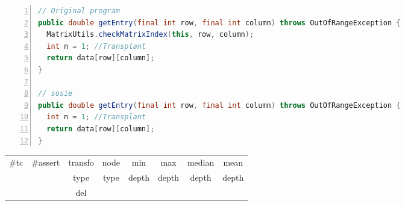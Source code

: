 \begin{minipage}{\columnwidth}
\begin{lstlisting}[caption={Two variants of \texttt{getEntry} in commons.maths},language=java,numbers=left]
// Original program
public double getEntry(final int row, final int column) throws OutOfRangeException {
  MatrixUtils.checkMatrixIndex(this, row, column);
  int n = 1; //Transplant
  return data[row][column];
}

// sosie
public double getEntry(final int row, final int column) throws OutOfRangeException {
  int n = 1; //Transplant
  return data[row][column];
}
\end{lstlisting}
\tabcolsep=0.11cm
\begin{tabular}{>{\small}c>{\small}c>{\small}c>{\small}c>{\small}c>{\small}c>{\small}c>{\small}c}
\hline
\rowcolor{lightgray} \#tc & \#assert & transfo & node & min & max & median & mean   \\
\rowcolor{lightgray}  & & type & type & depth  & depth & depth & depth  \\ 
\hline
 &  & del &  &  &  &  & \\
\hline
\end{tabular}
\end{minipage}